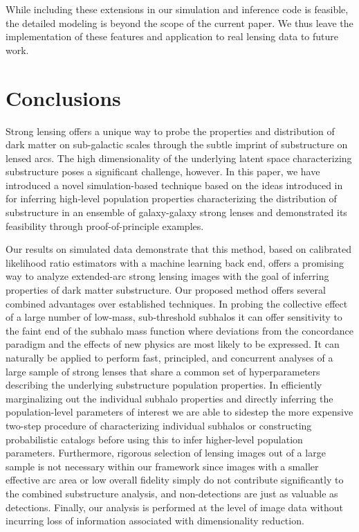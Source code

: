\documentclass[twocolumn]{aastex63}
\begin{document}
While including these extensions in our simulation and inference code is feasible, the detailed modeling is beyond the scope of the current paper. We thus leave the implementation of these features and application to real lensing data to future work.

\section{Conclusions}
\label{sec:conclusions}

Strong lensing offers a unique way to probe the properties and distribution of dark matter on sub-galactic scales through the subtle imprint of substructure on lensed arcs. The high dimensionality of the underlying latent space characterizing substructure poses a significant challenge, however. In this paper, we have introduced a novel simulation-based technique based on the ideas introduced in~\citet{1805.00013,1805.00020,1805.12244,Stoye:2018ovl} for inferring high-level population properties characterizing the distribution of substructure in an ensemble of galaxy-galaxy strong lenses and demonstrated its feasibility through proof-of-principle examples.

Our results on simulated data demonstrate that this method, based on calibrated likelihood ratio estimators with a machine learning back end, offers a promising way to analyze extended-arc strong lensing images with the goal of inferring properties of dark matter substructure. Our proposed method offers several combined advantages over established techniques. In probing the collective effect of a large number of low-mass, sub-threshold subhalos it can offer sensitivity to the faint end of the subhalo mass function where deviations from the concordance \lcdm paradigm and the effects of new physics are most likely to be expressed. It can naturally be applied to perform fast, principled, and concurrent analyses of a large sample of strong lenses that share a common set of hyperparameters describing the underlying substructure population properties. In efficiently marginalizing out the individual subhalo properties and directly inferring the population-level parameters of interest we are able to sidestep the more expensive two-step procedure of characterizing individual subhalos or constructing probabilistic catalogs before using this to infer higher-level population parameters. Furthermore, rigorous selection of lensing images out of a large sample is not necessary within our framework since images with a smaller effective arc area or low overall fidelity simply do not contribute significantly to the combined substructure analysis, and non-detections are just as valuable as detections. Finally, our analysis is performed at the level of image data without incurring loss of information associated with dimensionality reduction.
\end{document}
